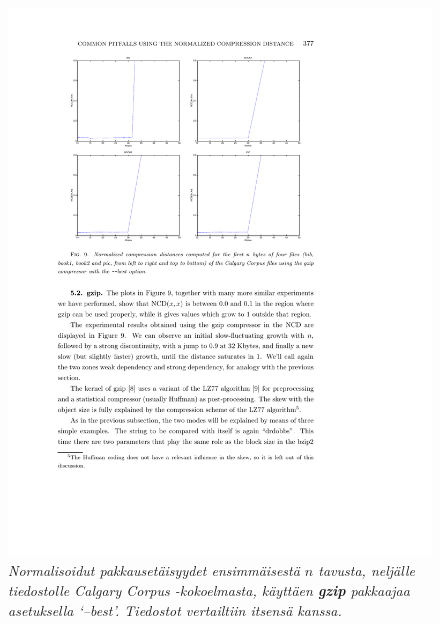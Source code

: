 \documentclass[12pt,finnish]{tktltiki2}
\theoremstyle{definition}
\theoremstyle{remark}
\begin{document}
    \begin{figure}[tb]
      \includegraphics[width=\textwidth]{img/gzip-best}
      \caption{\emph{Normalisoidut pakkausetäisyydet ensimmäisestä $n$ tavusta, neljälle tiedostolle Calgary Corpus -kokoelmasta, käyttäen \textbf{gzip} pakkaajaa asetuksella `--best'. Tiedostot vertailtiin itsensä kanssa.} \cite{cebrian2005common}}
      \label{fig:gzip-best}
    \end{figure}
\end{document}
